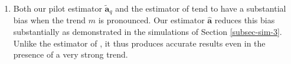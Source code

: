 \begin{enumerate}[label=(\alph*),leftmargin=0.7cm]
\item Both our pilot estimator $\widetilde{\boldsymbol{a}}_q$ and the estimator of \cite{Hall2003} tend to have a substantial bias when the trend $m$ is pronounced. Our estimator $\widehat{\boldsymbol{a}}$ reduces this bias substantially as demonstrated in the simulations of Section \ref{subsec-sim-3}. Unlike the estimator of \cite{Hall2003}, it thus produces accurate results even in the presence of a very strong trend. 
\end{enumerate}


